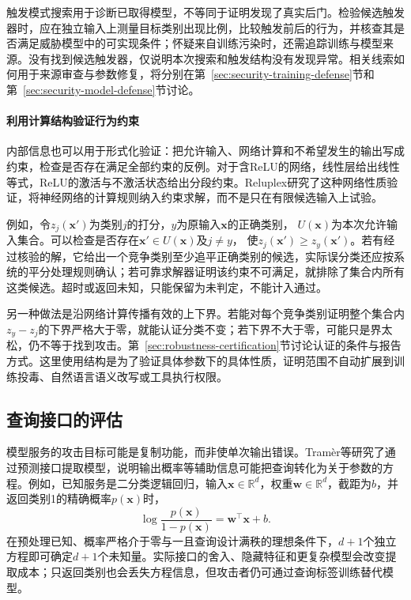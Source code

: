 触发模式搜索用于诊断已取得模型，不等同于证明发现了真实后门。检验候选触发器时，应在独立输入上测量目标类别出现比例，比较触发前后的行为，并核查其是否满足威胁模型中的可实现条件；怀疑来自训练污染时，还需追踪训练与模型来源。没有找到候选触发器，仅说明本次搜索和触发结构没有发现异常。相关线索如何用于来源审查与参数修复，将分别在第~\ref{sec:security-training-defense}节和第~\ref{sec:security-model-defense}节讨论。

\paragraph{利用计算结构验证行为约束}

内部信息也可以用于形式化验证：把允许输入、网络计算和不希望发生的输出写成约束，检查是否存在满足全部约束的反例。对于含ReLU的网络，线性层给出线性等式，ReLU的激活与不激活状态给出分段约束。Reluplex研究了这种网络性质验证，将神经网络的计算规则纳入约束求解，而不是只在有限候选输入上试验。

例如，令$z_j(\bm{x}')$为类别$j$的打分，$y$为原输入$\bm{x}$的正确类别，
$U(\bm{x})$为本次允许输入集合。可以检查是否存在$\bm{x}'\in U(\bm{x})$及$j\ne y$，
使$z_j(\bm{x}')\geq z_y(\bm{x}')$。若有经过核验的解，它给出一个竞争类别至少追平正确类别的候选，实际误分类还应按系统的平分处理规则确认；若可靠求解器证明该约束不可满足，就排除了集合内所有这类候选。超时或返回未知，只能保留为未判定，不能计入通过。

另一种做法是沿网络计算传播有效的上下界。若能对每个竞争类别证明整个集合内$z_y-z_j$的下界严格大于零，就能认证分类不变；若下界不大于零，可能只是界太松，仍不等于找到攻击。第~\ref{sec:robustness-certification}节讨论认证的条件与报告方式。这里使用结构是为了验证具体参数下的具体性质，证明范围不自动扩展到训练投毒、自然语言语义改写或工具执行权限。

\subsection{查询接口的评估}
\label{sec:security-information-test}

模型服务的攻击目标可能是复制功能，而非使单次输出错误。Tramèr等研究了通过预测接口提取模型，说明输出概率等辅助信息可能把查询转化为关于参数的方程。例如，已知服务是二分类逻辑回归，输入$\bm{x}\in\mathbb R^d$，权重$\bm{w}\in\mathbb R^d$，截距为$b$，并返回类别1的精确概率$p(\bm{x})$时，
\begin{equation}
 \log\frac{p(\bm{x})}{1-p(\bm{x})}
 =\bm{w}^{\top}\bm{x}+b.
 \label{eq:security-model-extraction}
\end{equation}
在预处理已知、概率严格介于零与一且查询设计满秩的理想条件下，$d+1$个独立方程即可确定$d+1$个未知量。实际接口的舍入、隐藏特征和更复杂模型会改变提取成本；只返回类别也会丢失方程信息，但攻击者仍可通过查询标签训练替代模型。

